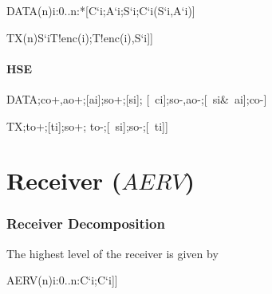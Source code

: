 \documentclass{article}
\begin{document}
\begin{csp}
DATA(n)\equiv\langle\pll\!i:0..n:*[C`i;A`i;S`i;C`i\star(S`i,A`i)]\rangle
\end{csp}

\begin{csp}
TX(n)\equiv*[[\langle[]S`i\star\!T!enc(i);T!enc(i),S`i\rangle]]
\end{csp}

\subsection{HSE}

\begin{hse}
DATA\equiv*
  [[ci];co+,ao+;[ai];so+;[si];
   [~ci];so-,ao-;[~si&~ai];co-]

TX\equiv*
  [[si];to+;[ti];so+;
   to-;[~si];so-;[~ti]]
\end{hse}


\part{Receiver ($AERV$)}

\section{Receiver Decomposition}

The highest level of the receiver is given by

\begin{csp}
AERV(n)\equiv*[[\langle[]i:0..n:C`i;C`i]]
\end{csp}
\end{document}
